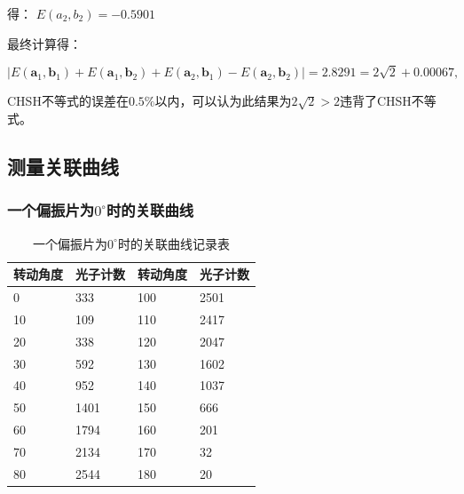\documentclass[a4paper,UTF8]{ctexart}
\begin{document}
得： $E(a_2,b_2) = -0.5901$

最终计算得：

$$
|E\left(\boldsymbol{a}_1,\boldsymbol{b}_1\right)+E\left(\boldsymbol{a}_1,\boldsymbol{b}_2\right)+E\left(\boldsymbol{a}_2,\boldsymbol{b}_1\right)-E\left(\boldsymbol{a}_2,\boldsymbol{b}_2\right)| = 2.8291 = 2\sqrt{2} + 0.00067,
$$

CHSH不等式的误差在$0.5\%$以内，可以认为此结果为$2\sqrt{2}>2$违背了CHSH不等式。

\subsection{测量关联曲线}

\subsubsection{一个偏振片为$0^{\circ}$时的关联曲线}

\begin{table}[H]
    \centering
    \caption{一个偏振片为$0^{\circ}$时的关联曲线记录表}
    \begin{tabular}{|l|l|l|l|}
    \hline
        \textbf{转动角度} & \textbf{光子计数} & \textbf{转动角度} & \textbf{光子计数} \\ \hline
        0 & 333 & 100 & 2501 \\ \hline
        10 & 109 & 110 & 2417 \\ \hline
        20 & 338 & 120 & 2047 \\ \hline
        30 & 592 & 130 & 1602 \\ \hline
        40 & 952 & 140 & 1037 \\ \hline
        50 & 1401 & 150 & 666 \\ \hline
        60 & 1794 & 160 & 201 \\ \hline
        70 & 2134 & 170 & 32 \\ \hline
        80 & 2544 & 180 & 20 \\ \hline
    \end{tabular}
\end{table}
\end{document}
